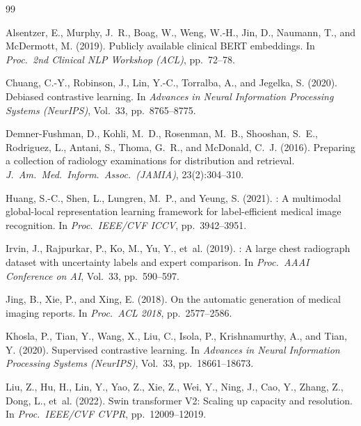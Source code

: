 \documentclass[11pt, a4paper]{article}
\begin{document}
\begin{thebibliography}{99}

Alsentzer, E., Murphy, J.~R., Boag, W., Weng, W.-H., Jin, D., Naumann, T.,
  and McDermott, M. (2019).
\newblock Publicly available clinical {BERT} embeddings.
\newblock In \textit{Proc.\ 2nd Clinical NLP Workshop (ACL)}, pp.\ 72--78.

Chuang, C.-Y., Robinson, J., Lin, Y.-C., Torralba, A., and Jegelka, S.
  (2020).
\newblock Debiased contrastive learning.
\newblock In \textit{Advances in Neural Information Processing Systems
  (NeurIPS)}, Vol.~33, pp.\ 8765--8775.

Demner-Fushman, D., Kohli, M.~D., Rosenman, M.~B., Shooshan, S.~E.,
  Rodriguez, L., Antani, S., Thoma, G.~R., and McDonald, C.~J. (2016).
\newblock Preparing a collection of radiology examinations for distribution
  and retrieval.
\newblock \textit{J.\ Am.\ Med.\ Inform.\ Assoc.\ (JAMIA)}, 23(2):304--310.

Huang, S.-C., Shen, L., Lungren, M.~P., and Yeung, S. (2021).
: A multimodal global-local representation learning
  framework for label-efficient medical image recognition.
\newblock In \textit{Proc.\ IEEE/CVF ICCV}, pp.\ 3942--3951.

Irvin, J., Rajpurkar, P., Ko, M., Yu, Y., et~al. (2019).
: A large chest radiograph dataset with uncertainty
  labels and expert comparison.
\newblock In \textit{Proc.\ AAAI Conference on AI}, Vol.~33, pp.\ 590--597.

Jing, B., Xie, P., and Xing, E. (2018).
\newblock On the automatic generation of medical imaging reports.
\newblock In \textit{Proc.\ ACL 2018}, pp.\ 2577--2586.

Khosla, P., Tian, Y., Wang, X., Liu, C., Isola, P., Krishnamurthy, A.,
  and Tian, Y. (2020).
\newblock Supervised contrastive learning.
\newblock In \textit{Advances in Neural Information Processing Systems
  (NeurIPS)}, Vol.~33, pp.\ 18661--18673.

Liu, Z., Hu, H., Lin, Y., Yao, Z., Xie, Z., Wei, Y., Ning, J., Cao, Y.,
  Zhang, Z., Dong, L., et~al. (2022).
\newblock Swin transformer {V2}: Scaling up capacity and resolution.
\newblock In \textit{Proc.\ IEEE/CVF CVPR}, pp.\ 12009--12019.


\end{thebibliography}
\end{document}
